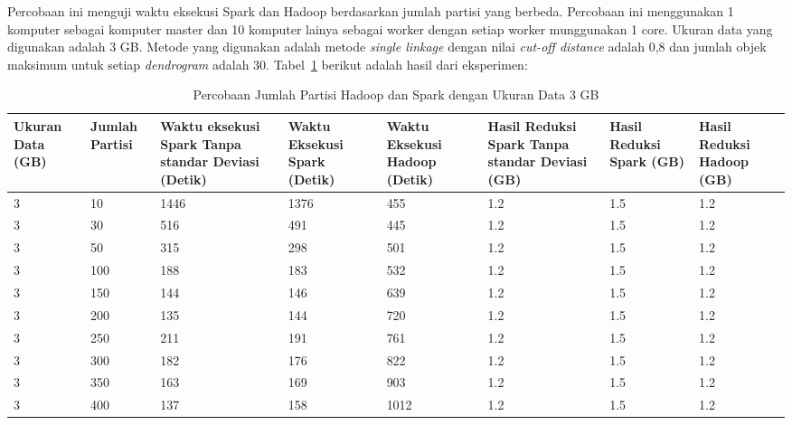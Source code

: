 

Percobaan ini menguji waktu eksekusi Spark dan Hadoop berdasarkan jumlah partisi yang berbeda. Percobaan ini menggunakan 1 komputer sebagai komputer master dan 10 komputer lainya sebagai worker dengan setiap worker munggunakan 1 core. Ukuran data yang digunakan adalah 3 GB. Metode yang digunakan adalah metode \textit{single linkage} dengan nilai \textit{cut-off distance} adalah 0,8 dan jumlah objek maksimum untuk setiap \textit{dendrogram} adalah 30. Tabel~\ref{tab:spark3} berikut adalah hasil dari eksperimen:

\begin{table}[H] 
	\centering 
	\caption{Percobaan Jumlah Partisi Hadoop dan Spark dengan Ukuran Data 3 GB}
	\label{tab:spark3}
	\begin{tabular}{|p{1cm}|p{1cm}|p{2cm}|p{2cm}|p{2cm}|p{2cm}|p{2cm}|p{2cm}|}
\hline
Ukuran Data (GB) & Jumlah Partisi &  Waktu eksekusi Spark Tanpa standar Deviasi (Detik) & Waktu Eksekusi Spark (Detik) & Waktu Eksekusi Hadoop (Detik) & Hasil Reduksi Spark Tanpa standar Deviasi (GB) & Hasil Reduksi Spark (GB)  & Hasil Reduksi Hadoop (GB)\\ 
\hline
3 & 10 & 1446 & 1376 & 455 & 1.2 & 1.5 & 1.2 \\
\hline
3 & 30 & 516 & 491 & 445 & 1.2 & 1.5 & 1.2 \\
\hline
3 & 50 & 315 & 298 & 501 & 1.2 & 1.5 & 1.2 \\
\hline
3 & 100 & 188 & 183 & 532 & 1.2 & 1.5 & 1.2 \\
\hline
3 & 150 & 144 & 146 & 639 & 1.2 & 1.5 & 1.2 \\
\hline
3 & 200 & 135 & 144 & 720 & 1.2 & 1.5 & 1.2 \\
\hline
3 & 250 & 211 & 191 & 761 & 1.2 & 1.5 & 1.2 \\
\hline
3 & 300 & 182 & 176 & 822 & 1.2 & 1.5 & 1.2 \\
\hline
3 & 350 & 163 & 169 & 903 & 1.2 & 1.5 & 1.2 \\
\hline
3 & 400 & 137 & 158 & 1012 & 1.2 & 1.5 & 1.2 \\
\hline


\hline

	\end{tabular} 
\end{table}



\def\scl{1}

\def\leg{} 
\def\std{none}
\def\ymin{}
\def\ymax{}

